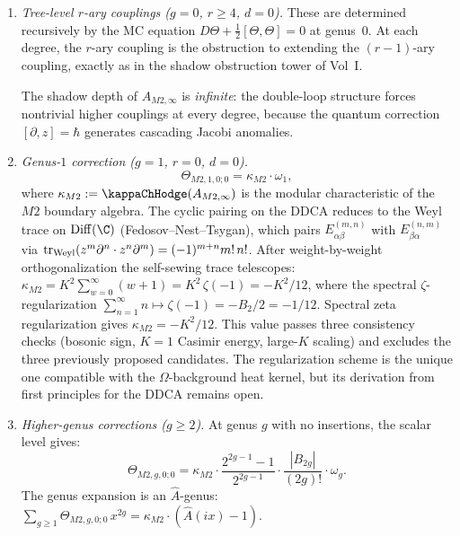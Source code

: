 \begin{theorem}
\begin{enumerate}[label=(\roman*),leftmargin=1.8em]
\item \emph{Tree-level $r$-ary couplings ($g=0$, $r\ge 4$, $d=0$).}
These are determined recursively by the MC equation
$D\Theta + \tfrac{1}{2}[\Theta,\Theta]=0$ at genus~$0$.
At each degree, the $r$-ary coupling is the obstruction
to extending the $(r-1)$-ary coupling, exactly as in
the shadow obstruction tower of Vol~I.

The shadow depth of $A_{M2,\infty}$ is \emph{infinite}:
the double-loop structure forces nontrivial higher
couplings at every degree, because the quantum correction
$[\partial,z]=\hbar$ generates cascading Jacobi anomalies.

\item \emph{Genus-$1$ correction ($g=1$, $r=0$, $d=0$).}
\begin{equation}%
\Theta_{M2,1,0;0}
= \kappa_{M2}\cdot\omega_1,
\end{equation}
where $\kappa_{M2} := \kappaChHodge(A_{M2,\infty})$ is the modular
characteristic of the $M2$ boundary algebra. The cyclic pairing
on the DDCA reduces to the Weyl trace on $\Diff(\C)$
(Fedosov--Nest--Tsygan), which pairs $E^{(m,n)}_{\alpha\beta}$
with $E^{(n,m)}_{\beta\alpha}$ via
$\operatorname{tr}_{\mathrm{Weyl}}(z^m\partial^n \cdot z^n\partial^m)
= (-1)^{m+n} m!\, n!$.
After weight-by-weight orthogonalization the self-sewing
trace telescopes:
$\kappa_{M2} = K^2 \sum_{w=0}^{\infty}(w+1)
= K^2\,\zeta(-1) = -K^2/12$,
where the spectral $\zeta$-regularization
$\sum_{n=1}^{\infty} n \mapsto \zeta(-1) = -B_2/2 = -1/12$.
Spectral zeta regularization gives $\kappa_{M2} = -K^2/12$.
This value passes three consistency checks (bosonic sign,
$K=1$ Casimir energy, large-$K$ scaling) and excludes the
three previously proposed candidates. The regularization
scheme is the unique one compatible with the $\Omega$-background
heat kernel, but its derivation from first principles for the
DDCA remains open.
\ClaimStatusHeuristic

\item \emph{Higher-genus corrections ($g\ge 2$).}
At genus $g$ with no insertions, the scalar level gives:
\begin{equation}%
\Theta_{M2,g,0;0}
= \kappa_{M2}\cdot\frac{2^{2g-1}-1}{2^{2g-1}}\cdot\frac{|B_{2g}|}{(2g)!}\cdot\omega_g.
\end{equation}
The genus expansion is an $\hat{A}$-genus:
$\sum_{g\ge 1}\Theta_{M2,g,0;0}\,x^{2g}
= \kappa_{M2}\cdot(\hat{A}(ix)-1)$.


\end{enumerate}
\end{theorem}

